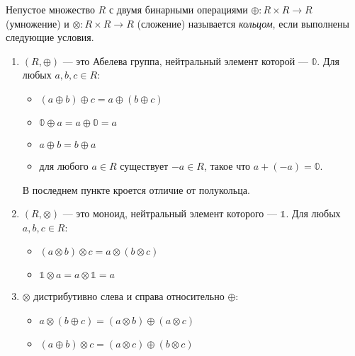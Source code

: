 \begin{definition}

Непустое множество $R$ с двумя бинарными операциями $\oplus\colon R \times R \to R$ (умножение) и $\otimes \colon R \times R \to R$ (сложение) называется \emph{кольцом}, если выполнены следующие условия.
\begin{enumerate}

\item $(R, \oplus)$ --- это Абелева группа, нейтральный элемент которой --- $\mathbb{0}$. Для любых $a,b,c \in R$:
\begin{itemize}
	\item $(a \oplus b) \oplus c = a \oplus (b \oplus c)$
	\item $\mathbb{0} \oplus a = a \oplus \mathbb{0} = a$
	\item $a \oplus b = b \oplus a$
	\item для любого $a \in R$ существует $-a \in  R$, такое что $a + (-a) = \mathbb{0}$.
\end{itemize}
В последнем пункте кроется отличие от полукольца.

\item $(R, \otimes)$ --- это моноид, нейтральный элемент которого --- $\mathbb{1}$. Для любых $a,b,c \in R$:
\begin{itemize}
	\item $(a \otimes b) \otimes c = a \otimes (b \otimes c)$
    \item $\mathbb{1} \otimes a = a \otimes \mathbb{1} = a$
\end{itemize}

\item $\otimes$ дистрибутивно слева и справа относительно $\oplus$:
\begin{itemize}
	\item $a \otimes (b \oplus c) = (a \otimes b) \oplus (a \otimes c)$
    \item $(a \oplus b) \otimes c = (a \otimes c) \oplus (b \otimes c)$
\end{itemize}

\end{enumerate}


\end{definition}
